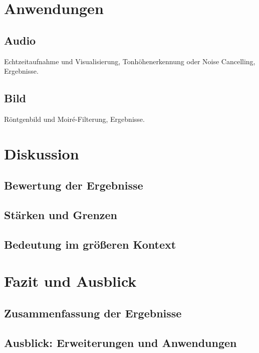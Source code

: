 \documentclass[a4paper,12pt]{article}
\begin{document}
\section{Anwendungen}
\subsection{Audio}
Echtzeitaufnahme und Visualisierung, Tonhöhenerkennung oder Noise Cancelling, Ergebnisse.
\subsection{Bild}
Röntgenbild und Moiré-Filterung, Ergebnisse.

\section{Diskussion}
\subsection{Bewertung der Ergebnisse}
\subsection{Stärken und Grenzen}
\subsection{Bedeutung im größeren Kontext}

\section{Fazit und Ausblick}
\subsection{Zusammenfassung der Ergebnisse}
\subsection{Ausblick: Erweiterungen und Anwendungen}
\end{document}
